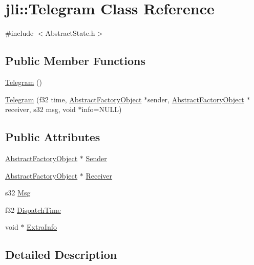 \hypertarget{classjli_1_1_telegram}{\section{jli\+:\+:Telegram Class Reference}
\label{classjli_1_1_telegram}
}


{\ttfamily \#include $<$Abstract\+State.\+h$>$}

\subsection*{Public Member Functions}
\begin{DoxyCompactItemize}
\item 
\hyperlink{classjli_1_1_telegram_a499e1f513523c1a818d872548dd71639}{Telegram} ()
\item 
\hyperlink{classjli_1_1_telegram_ad4324e3e73558ad90a7941171ed48d46}{Telegram} (f32 time, \hyperlink{classjli_1_1_abstract_factory_object}{Abstract\+Factory\+Object} $\ast$sender, \hyperlink{classjli_1_1_abstract_factory_object}{Abstract\+Factory\+Object} $\ast$receiver, s32 msg, void $\ast$info=N\+U\+L\+L)
\end{DoxyCompactItemize}
\subsection*{Public Attributes}
\begin{DoxyCompactItemize}
\item 
\hyperlink{classjli_1_1_abstract_factory_object}{Abstract\+Factory\+Object} $\ast$ \hyperlink{classjli_1_1_telegram_ad4088edaa292abb81a48c26a898addb8}{Sender}
\item 
\hyperlink{classjli_1_1_abstract_factory_object}{Abstract\+Factory\+Object} $\ast$ \hyperlink{classjli_1_1_telegram_a32cc7c9021bcf0b3dc32790c282cbe73}{Receiver}
\item 
s32 \hyperlink{classjli_1_1_telegram_a9a8225da9970a32ede98dc78878b31bc}{Msg}
\item 
f32 \hyperlink{classjli_1_1_telegram_ac345246908f0d3c00df7cc7e2e6989c2}{Dispatch\+Time}
\item 
void $\ast$ \hyperlink{classjli_1_1_telegram_a8ab71bba704b1f118d4d4863dbc93974}{Extra\+Info}
\end{DoxyCompactItemize}


\subsection{Detailed Description}


